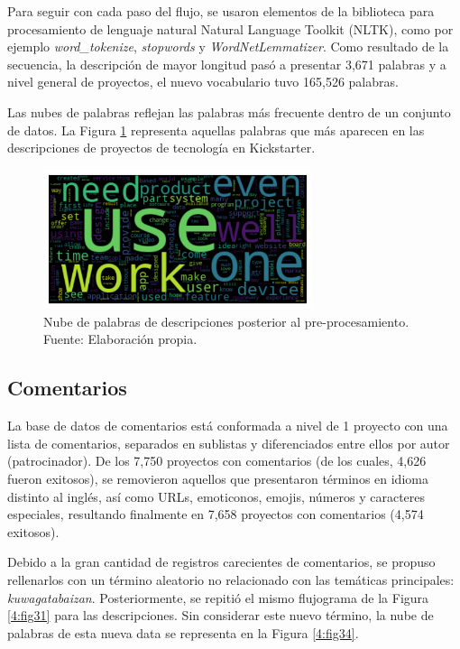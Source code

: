 Para seguir con cada paso del flujo, se usaron elementos de la biblioteca para procesamiento de lenguaje natural Natural Language Toolkit (NLTK), como por ejemplo \textit{word\_tokenize}, \textit{stopwords} y \textit{WordNetLemmatizer}. Como resultado de la secuencia, la descripción de mayor longitud pasó a presentar 3,671 palabras y a nivel general de proyectos, el nuevo vocabulario tuvo 165,526 palabras.

Las nubes de palabras reflejan las palabras más frecuente dentro de un conjunto de datos. La Figura \ref{4:fig33} representa aquellas palabras que más aparecen en las descripciones de proyectos de tecnología en Kickstarter.

\begin{figure}[!ht]
	\begin{center}
		\includegraphics[width=0.7\textwidth]{4/figures/description_wordcloud.png}
		\caption{Nube de palabras de descripciones posterior al pre-procesamiento. Fuente: Elaboración propia.}
		\label{4:fig33}
	\end{center}
\end{figure}

\subsection{Comentarios}
La base de datos de comentarios está conformada a nivel de 1 proyecto con una lista de comentarios, separados en sublistas y diferenciados entre ellos por autor (patrocinador). De los 7,750 proyectos con comentarios (de los cuales, 4,626 fueron exitosos), se removieron aquellos que presentaron términos en idioma distinto al inglés, así como URLs, emoticonos, emojis, números y caracteres especiales, resultando finalmente en 7,658 proyectos con comentarios (4,574 exitosos).

Debido a la gran cantidad de registros carecientes de comentarios, se propuso rellenarlos con un término aleatorio no relacionado con las temáticas principales: \textit{kuwagatabaizan}. Posteriormente, se repitió el mismo flujograma de la Figura \ref{4:fig31} para las descripciones. Sin considerar este nuevo término, la nube de palabras de esta nueva data se representa en la Figura \ref{4:fig34}.

